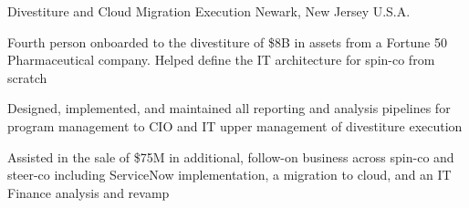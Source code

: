 \begin{cventries}
  \cventry
    {Divestiture and Cloud Migration Execution} %
    {} %
    {} %
    {Newark, New Jersey U.S.A.} %
    {
      \begin{cvitems} %
        \item {Fourth person onboarded to the divestiture of \$8B in assets from a Fortune 50 Pharmaceutical company. Helped define the IT architecture for spin-co from scratch}
        \item {Designed, implemented, and maintained all reporting and analysis pipelines for program management to CIO and IT upper management of divestiture execution}
        \item {Assisted in the sale of \$75M in additional, follow-on business across spin-co and steer-co including ServiceNow implementation, a migration to cloud, and an IT Finance analysis and revamp}
      \end{cvitems}
    }

\end{cventries}